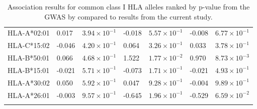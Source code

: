 \documentclass[]{article}
\begin{document}
\begin{doublespace}
\begin{longtable}[H]{p{3cm}p{1cm}p{2cm}p{1cm}p{2cm}p{1cm}p{2cm}}
		HLA-A*02:01 & 0.017 & $3.94 \times 10^{-1}$ & -0.018 & $5.57 \times 10^{-1}$ & -0.008 & $6.77 \times 10^{-1}$ \\ 
		HLA-C*15:02 & -0.046 & $4.20 \times 10^{-1}$ & 0.064 & $3.26 \times 10^{-1}$ & 0.033 & $3.78 \times 10^{-1}$ \\ 
		HLA-B*50:01 & 0.066 & $4.68 \times 10^{-1}$ & 1.522 & $1.77 \times 10^{-2}$ & 0.970 & $8.73 \times 10^{-3}$ \\ 
		HLA-B*15:01 & -0.021 & $5.71 \times 10^{-1}$ & -0.073 & $1.71 \times 10^{-1}$ & -0.021 & $4.93 \times 10^{-1}$ \\ 
		HLA-A*30:02 & 0.050 & $5.92 \times 10^{-1}$ & 0.047 & $9.28 \times 10^{-1}$ & -0.004 & $9.89 \times 10^{-1}$ \\ 
		HLA-A*26:01 & -0.003 & $9.57 \times 10^{-1}$ & -0.645 & $1.96 \times 10^{-1}$ & -0.529 & $6.59 \times 10^{-2}$ \\
		\hline
		\caption{Association results for common class I HLA alleles ranked by p-value from the GWAS by \citet{McLaren2015} compared to results from the current study.}
		\label{tab:full-mclaren-comparison}
\end{longtable}


\end{doublespace}
\end{document}
